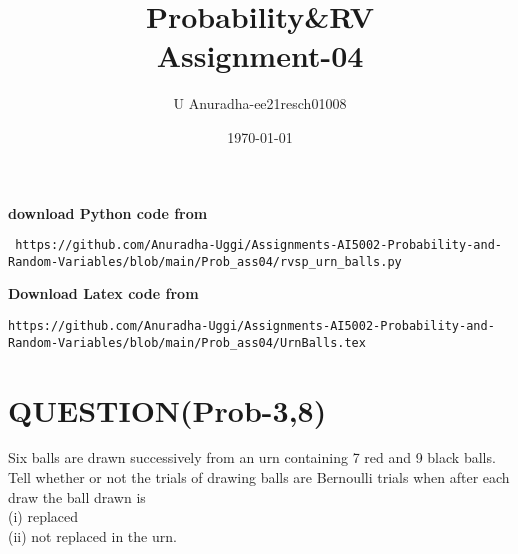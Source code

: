 \documentclass[journal,12pt,twocolumn]{IEEEtran}
\title{Probability\&RV \\ Assignment-04}
\author{U Anuradha-ee21resch01008}
\date{\today}
\begin{document}
\maketitle
\newpage
\bigskip
\renewcommand{\thefigure}{\theenumi}
\renewcommand{\thetable}{\theenumi}
\textbf{download Python code from}
\begin{lstlisting}
 https://github.com/Anuradha-Uggi/Assignments-AI5002-Probability-and-Random-Variables/blob/main/Prob_ass04/rvsp_urn_balls.py
\end{lstlisting}
\textbf{Download Latex code from}
\begin{lstlisting}
https://github.com/Anuradha-Uggi/Assignments-AI5002-Probability-and-Random-Variables/blob/main/Prob_ass04/UrnBalls.tex
\end{lstlisting}
\section{QUESTION(Prob-3,8)}
Six balls are drawn successively from an
urn containing 7 red and 9 black balls. Tell
whether or not the trials of drawing balls are
Bernoulli trials when after each draw the ball
drawn is\\
(i) replaced\\
(ii) not replaced in the urn.
\end{document}

